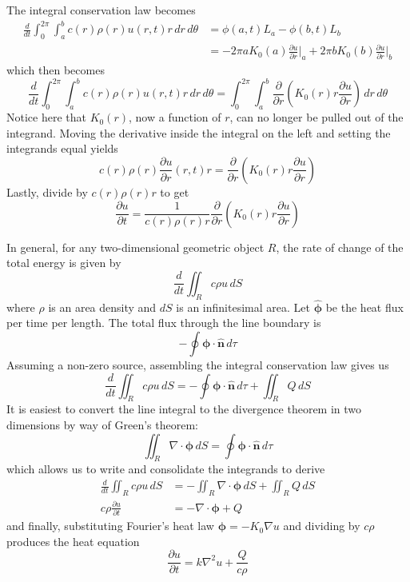 \documentclass[a4paper]{article}
\begin{document}
\newpage

The integral conservation law becomes
\begin{align*}
	\frac{d }{d t}\int^{2 \pi}_{0} \int^{b}_{a} c \!\left( r \right)\rho \!\left( r \right)u \!\left( r,t \right) r \, dr \, d \theta & = \phi \!\left( a,t \right)L_{a} - \phi \!\left( b,t \right)L_{b} \\
	 & = -2 \pi a K_{0}\!\left( a \right)\frac{\partial u}{\partial r}\Big|_{a} + 2 \pi b K_{0}\!\left( b \right)\frac{\partial u}{\partial r}\Big|_{b}
\end{align*}
which then becomes
\[
	\frac{d }{d t}\int^{2 \pi}_{0} \int^{b}_{a} c \!\left( r \right)\rho \!\left( r \right)u \!\left( r,t \right) r \, dr \, d \theta = \int^{2 \pi}_{0} \int^{b}_{a} \frac{\partial }{\partial r}\!\left( K_{0}\!\left( r \right)r \frac{\partial u}{\partial r} \right) \, dr \, d \theta  
\]
Notice here that \( K_{0}\!\left( r \right) \), now a function of \( r \), can no longer be pulled out of the integrand. Moving the derivative inside the integral on the left and setting the integrands equal yields
\[
	c \!\left( r \right) \rho \!\left( r \right) \frac{\partial u}{\partial r} \!\left( r,t \right) r = \frac{\partial }{\partial r}\!\left( K_{0}\!\left( r \right)r \frac{\partial u}{\partial r} \right) 
\]
Lastly, divide by \( c \!\left( r \right) \rho \!\left( r \right) r \) to get
\[
	\frac{\partial u}{\partial t} = \frac{1}{c \!\left( r \right) \rho \!\left( r \right) r} \frac{\partial }{\partial r}\!\left( K_{0}\!\left( r \right) r \frac{\partial u}{\partial r} \right) 
\]


In general, for any two-dimensional geometric object \( R \), the rate of change of the total energy is given by
\[
	\frac{d }{dt}\iint_{R} c \rho u \, dS
\]
where \( \rho \) is an area density and \( dS \) is an infinitesimal area. Let \( \pmb{\hat{\phi}} \) be the heat flux per time per length. The total flux through the line boundary is
\[
	-\oint \pmb{\phi} \cdot \pmb{\hat{n}} \, d \tau
\]
Assuming a non-zero source, assembling the integral conservation law gives us
\[
	\frac{d }{dt}\iint_{R} c \rho u \, dS = -\oint \pmb{\phi} \cdot \pmb{\hat{n}} \, d \tau + \iint_{R} Q \, dS
\]
It is easiest to convert the line integral to the divergence theorem in two dimensions by way of Green's theorem:
\[
	\iint_{R} \nabla \cdot \pmb{\phi} \, dS = \oint \pmb{\phi} \cdot \pmb{\hat{n}} \, d \tau
\]
which allows us to write and consolidate the integrands to derive
\begin{align*}
	\frac{d }{dt}\iint_{R} c \rho u \, dS & = -\iint_{R} \nabla \cdot \pmb{\phi} \, dS + \iint_{R} Q \, dS \\
	c \rho \frac{\partial u}{\partial t} & = -\nabla \cdot \pmb{\phi} + Q
\end{align*}
and finally, substituting Fourier's heat law \( \pmb{\phi} = -K_{0} \nabla u \) and dividing by \( c \rho \) produces the heat equation
\[
	\frac{\partial u}{\partial t} = k \nabla^{2}u + \frac{Q}{c \rho}
\]
\end{document}
